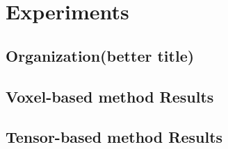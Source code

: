 \chapter{Experiments}
\section{Organization(better title)}


\section{Voxel-based method Results}

\section{Tensor-based method Results}